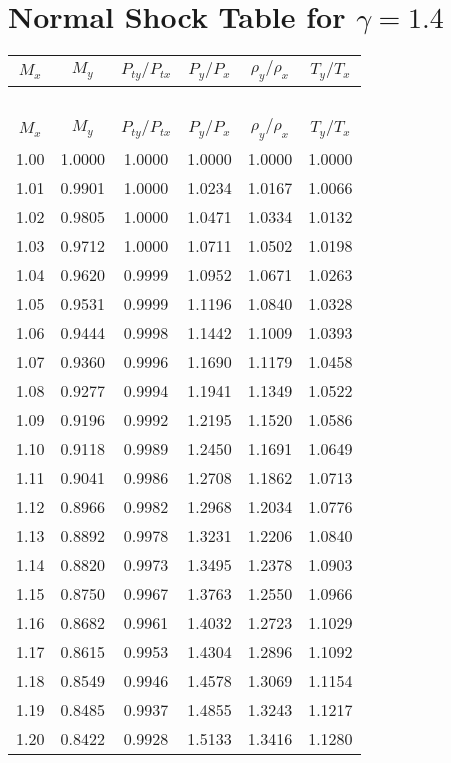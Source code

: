 \documentclass{article}
\begin{document}
\section*{Normal Shock Table for $\gamma = 1.4$}
\begin{longtable}{cccccc}  %

\toprule
$M_x$ & $M_y$ & $P_{ty}/P_{tx}$ & $P_y/P_x$ & $\rho_y/\rho_x$ & $T_y/T_x$ \\
\midrule
\endfirsthead
\multicolumn{6}{c}{~} \\
\toprule
$M_x$ & $M_y$ & $P_{ty}/P_{tx}$ & $P_y/P_x$ & $\rho_y/\rho_x$ & $T_y/T_x$ \\
\midrule
\endhead
1.00 & 1.0000 & 1.0000 & 1.0000 & 1.0000 & 1.0000 \\
1.01 & 0.9901 & 1.0000 & 1.0234 & 1.0167 & 1.0066 \\
1.02 & 0.9805 & 1.0000 & 1.0471 & 1.0334 & 1.0132 \\
1.03 & 0.9712 & 1.0000 & 1.0711 & 1.0502 & 1.0198 \\
1.04 & 0.9620 & 0.9999 & 1.0952 & 1.0671 & 1.0263 \\
1.05 & 0.9531 & 0.9999 & 1.1196 & 1.0840 & 1.0328 \\
1.06 & 0.9444 & 0.9998 & 1.1442 & 1.1009 & 1.0393 \\
1.07 & 0.9360 & 0.9996 & 1.1690 & 1.1179 & 1.0458 \\
1.08 & 0.9277 & 0.9994 & 1.1941 & 1.1349 & 1.0522 \\
1.09 & 0.9196 & 0.9992 & 1.2195 & 1.1520 & 1.0586 \\
1.10 & 0.9118 & 0.9989 & 1.2450 & 1.1691 & 1.0649 \\
1.11 & 0.9041 & 0.9986 & 1.2708 & 1.1862 & 1.0713 \\
1.12 & 0.8966 & 0.9982 & 1.2968 & 1.2034 & 1.0776 \\
1.13 & 0.8892 & 0.9978 & 1.3231 & 1.2206 & 1.0840 \\
1.14 & 0.8820 & 0.9973 & 1.3495 & 1.2378 & 1.0903 \\
1.15 & 0.8750 & 0.9967 & 1.3763 & 1.2550 & 1.0966 \\
1.16 & 0.8682 & 0.9961 & 1.4032 & 1.2723 & 1.1029 \\
1.17 & 0.8615 & 0.9953 & 1.4304 & 1.2896 & 1.1092 \\
1.18 & 0.8549 & 0.9946 & 1.4578 & 1.3069 & 1.1154 \\
1.19 & 0.8485 & 0.9937 & 1.4855 & 1.3243 & 1.1217 \\
1.20 & 0.8422 & 0.9928 & 1.5133 & 1.3416 & 1.1280 \\

\end{longtable}
\end{document}
